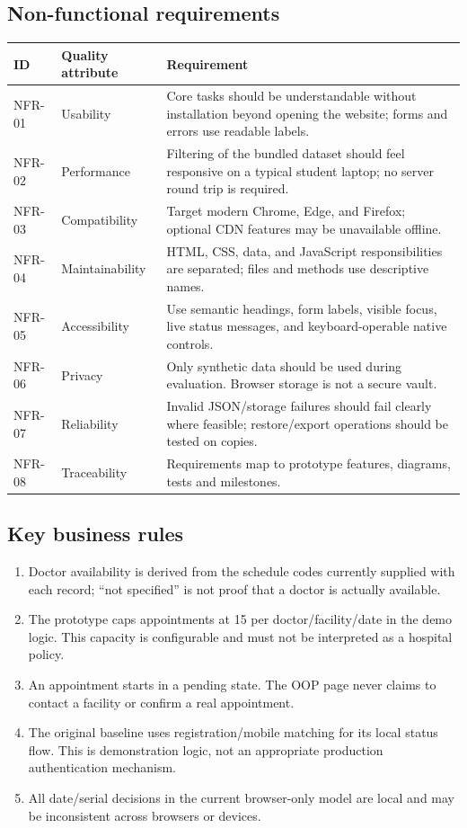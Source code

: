 \documentclass[11pt,a4paper]{article}
\begin{document}
\subsection{Non-functional requirements}
\begin{tabularx}{\textwidth}{p{1.5cm}p{3.2cm}X}
\toprule \textbf{ID} & \textbf{Quality attribute} & \textbf{Requirement}\\\midrule
NFR-01 & Usability & Core tasks should be understandable without installation beyond opening the website; forms and errors use readable labels.\\
NFR-02 & Performance & Filtering of the bundled dataset should feel responsive on a typical student laptop; no server round trip is required.\\
NFR-03 & Compatibility & Target modern Chrome, Edge, and Firefox; optional CDN features may be unavailable offline.\\
NFR-04 & Maintainability & HTML, CSS, data, and JavaScript responsibilities are separated; files and methods use descriptive names.\\
NFR-05 & Accessibility & Use semantic headings, form labels, visible focus, live status messages, and keyboard-operable native controls.\\
NFR-06 & Privacy & Only synthetic data should be used during evaluation. Browser storage is not a secure vault.\\
NFR-07 & Reliability & Invalid JSON/storage failures should fail clearly where feasible; restore/export operations should be tested on copies.\\
NFR-08 & Traceability & Requirements map to prototype features, diagrams, tests and milestones.\\
\bottomrule
\end{tabularx}

\subsection{Key business rules}
\begin{enumerate}
  \item Doctor availability is derived from the schedule codes currently supplied with each record; ``not specified'' is not proof that a doctor is actually available.
  \item The prototype caps appointments at 15 per doctor/facility/date in the demo logic. This capacity is configurable and must not be interpreted as a hospital policy.
  \item An appointment starts in a pending state. The OOP page never claims to contact a facility or confirm a real appointment.
  \item The original baseline uses registration/mobile matching for its local status flow. This is demonstration logic, not an appropriate production authentication mechanism.
  \item All date/serial decisions in the current browser-only model are local and may be inconsistent across browsers or devices.
\end{enumerate}
\end{document}
